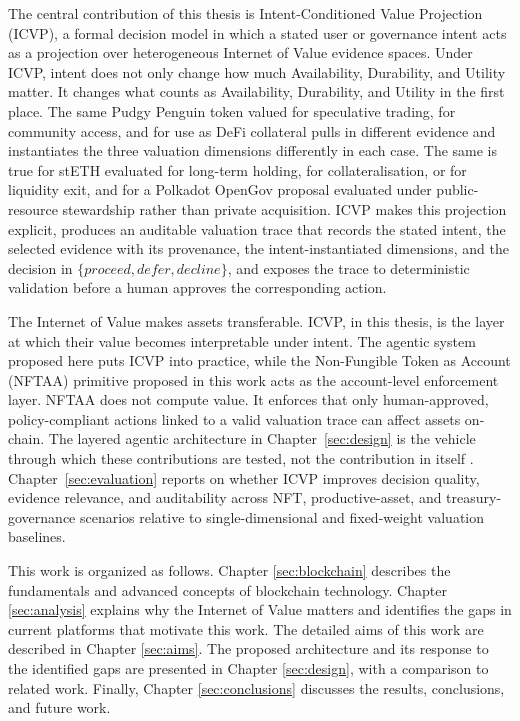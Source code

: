 The central contribution of this thesis is Intent-Conditioned Value Projection (ICVP), a formal decision model in which a stated user or governance intent acts as a projection over heterogeneous Internet of Value evidence spaces. Under ICVP, intent does not only change how much Availability, Durability, and Utility matter. It changes what counts as Availability, Durability, and Utility in the first place. The same Pudgy Penguin token valued for speculative trading, for community access, and for use as DeFi collateral pulls in different evidence and instantiates the three valuation dimensions differently in each case. The same is true for stETH evaluated for long-term holding, for collateralisation, or for liquidity exit, and for a Polkadot OpenGov proposal evaluated under public-resource stewardship rather than private acquisition. ICVP makes this projection explicit, produces an auditable valuation trace that records the stated intent, the selected evidence with its provenance, the intent-instantiated dimensions, and the decision in $\{\textit{proceed}, \textit{defer}, \textit{decline}\}$, and exposes the trace to deterministic validation before a human approves the corresponding action.

The Internet of Value makes assets transferable. ICVP, in this thesis, is the layer at which their value becomes interpretable under intent. The agentic system proposed here puts ICVP into practice, while the Non-Fungible Token as Account (NFTAA) primitive proposed in this work acts as the account-level enforcement layer. NFTAA does not compute value. It enforces that only human-approved, policy-compliant actions linked to a valid valuation trace can affect assets on-chain. The layered agentic architecture in Chapter~\ref{sec:design} is the vehicle through which these contributions are tested, not the contribution in itself \cite{Xi2023}. Chapter~\ref{sec:evaluation} reports on whether ICVP improves decision quality, evidence relevance, and auditability across NFT, productive-asset, and treasury-governance scenarios relative to single-dimensional and fixed-weight valuation baselines.

This work is organized as follows. Chapter \ref{sec:blockchain} describes the fundamentals and advanced concepts of blockchain technology.
Chapter \ref{sec:analysis} explains why the Internet of Value matters and identifies the gaps in current platforms that motivate this work.
The detailed aims of this work are described in Chapter \ref{sec:aims}.
The proposed architecture and its response to the identified gaps are presented in Chapter \ref{sec:design}, with a comparison to related work.
Finally, Chapter \ref{sec:conclusions} discusses the results, conclusions, and future work.
